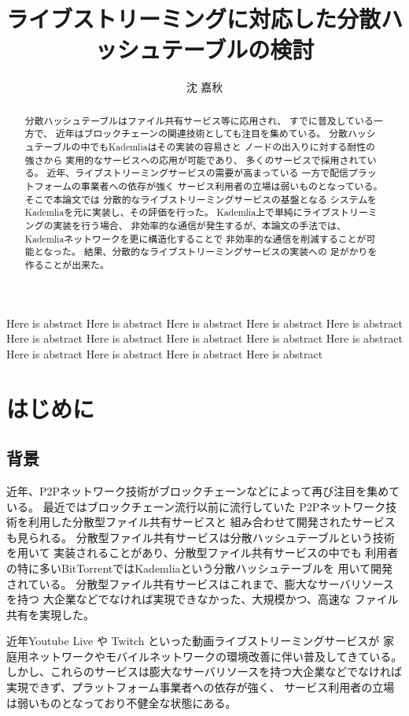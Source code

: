 \documentclass[sotsuron]{jcsie}
\title{ライブストリーミングに対応した分散ハッシュテーブルの検討}
\author{沈 嘉秋}
\begin{document}
\maketitle
\emaketitle
{}
\begin{abstract}    
	分散ハッシュテーブルはファイル共有サービス等に応用され、
	すでに普及している一方で、
	近年はブロックチェーンの関連技術としても注目を集めている。
	分散ハッシュテーブルの中でもKademliaはその実装の容易さと
	ノードの出入りに対する耐性の強さから
	実用的なサービスへの応用が可能であり、
	多くのサービスで採用されている。
	近年、ライブストリーミングサービスの需要が高まっている
	一方で配信プラットフォームの事業者への依存が強く
	サービス利用者の立場は弱いものとなっている。
	そこで本論文では
	分散的なライブストリーミングサービスの基盤となる
	システムをKademliaを元に実装し、その評価を行った。
	Kademlia上で単純にライブストリーミングの実装を行う場合、
	非効率的な通信が発生するが、本論文の手法では、
	Kademliaネットワークを更に構造化することで
	非効率的な通信を削減することが可能となった。
	結果、分散的なライブストリーミングサービスの実装への
	足がかりを作ることが出来た。
\end{abstract}
\begin{eabstract}
	Here is abstract
	Here is abstract
	Here is abstract
	Here is abstract
	Here is abstract
	Here is abstract
	Here is abstract
	Here is abstract
	Here is abstract
	Here is abstract
	Here is abstract
	Here is abstract
	Here is abstract
	Here is abstract
\end{eabstract}
\tableofcontents
{}
\chapter{はじめに}
\section{背景}
近年、P2Pネットワーク技術がブロックチェーンなどによって再び注目を集めている。
最近ではブロックチェーン流行以前に流行していた
P2Pネットワーク技術を利用した分散型ファイル共有サービスと
組み合わせて開発されたサービスも見られる。
\cite{btt:bittorrent}
分散型ファイル共有サービスは分散ハッシュテーブルという技術を用いて
実装されることがあり、分散型ファイル共有サービスの中でも
利用者の特に多いBitTorrentではKademliaという分散ハッシュテーブルを
用いて開発されている。
分散型ファイル共有サービスはこれまで、膨大なサーバリソースを持つ
大企業などでなければ実現できなかった、大規模かつ、高速な
ファイル共有を実現した。

近年Youtube Live や Twitch といった動画ライブストリーミングサービスが
家庭用ネットワークやモバイルネットワークの環境改善に伴い普及してきている。
しかし、これらのサービスは膨大なサーバリソースを持つ大企業などでなければ
実現できず、プラットフォーム事業者への依存が強く、
サービス利用者の立場は弱いものとなっており不健全な状態にある。
\end{document}
